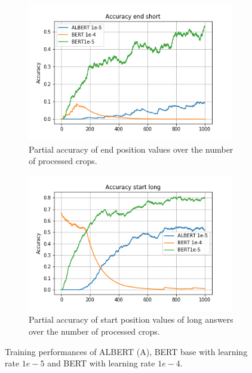 \documentclass[10pt,hidelinks]{article}
\begin{document}
\begin{figure}[ht]
\begin{subfigure}[t]{.49\textwidth}
		\includegraphics[width=0.99\textwidth]{report/pics/HP_acc2.png}
		\caption{Partial accuracy of end position values over the number of processed crops.}\label{fig:loss3}
	\end{subfigure}\hfill
	\begin{subfigure}[t]{.49\textwidth}
		\centering
		\includegraphics[width=0.99\textwidth]{report/pics/HP_acc3.png}
		\caption{Partial accuracy of start position values of long answers over the number of processed crops.}\label{fig:loss4}
	\end{subfigure}
	\caption{Training performances of ALBERT (A), BERT base with learning rate $1e-5$ and BERT with learning rate $1e-4$.}
	\label{fig:lr_005}
\end{figure}
\end{document}

